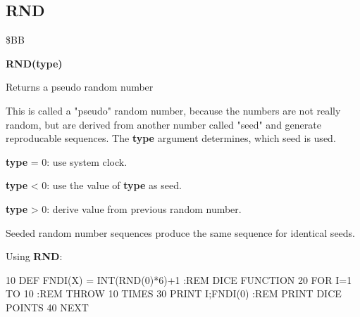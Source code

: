 \subsection{RND}
\begin{description}[leftmargin=3cm,style=nextline]
\item [Token:] \$BB
\item [Format:] {\bf RND(type)}
\item [Usage:] Returns a pseudo random number

               This is called a "pseudo" random number, because
               the numbers are not really random, but are derived
               from another number called "seed" and generate
               reproducable sequences. The {\bf type}
               argument determines, which seed is used.

               {\bf type} = 0: use system clock.

               {\bf type} < 0: use the value of {\bf type} as seed.

               {\bf type} > 0: derive value from previous random number.

\item [Remarks:] Seeded random number sequences produce the same
                 sequence for identical seeds.
\item [Example:] Using {\bf RND}:
\begin{screenoutput}
 10 DEF FNDI(X) = INT(RND(0)*6)+1 :REM DICE FUNCTION
 20 FOR I=1 TO 10                 :REM THROW 10 TIMES
 30 PRINT I;FNDI(0)               :REM PRINT DICE POINTS
 40 NEXT
\end{screenoutput}
\end{description}


\newpage
